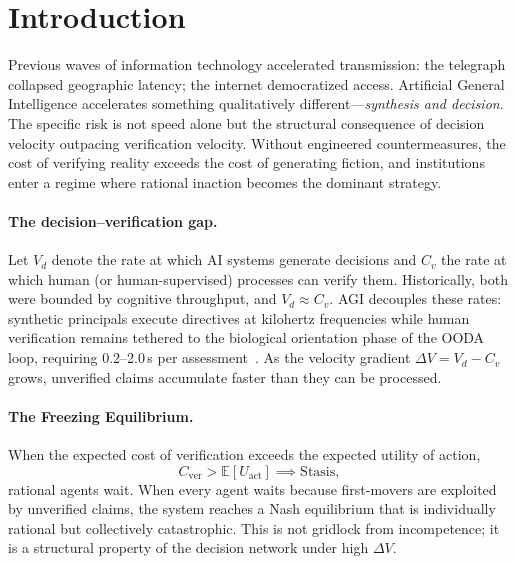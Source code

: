 \documentclass[runningheads]{llncs}
\begin{document}
\section{Introduction}
\label{sec:intro}

Previous waves of information technology accelerated transmission: the telegraph collapsed geographic latency; the internet democratized access. Artificial General Intelligence accelerates something qualitatively different---\emph{synthesis and decision}. The specific risk is not speed alone but the structural consequence of decision velocity outpacing verification velocity. Without engineered countermeasures, the cost of verifying reality exceeds the cost of generating fiction, and institutions enter a regime where rational inaction becomes the dominant strategy.

\paragraph{The decision--verification gap.}
Let $V_d$ denote the rate at which AI systems generate decisions and $C_v$ the rate at which human (or human-supervised) processes can verify them. Historically, both were bounded by cognitive throughput, and $V_d \approx C_v$. AGI decouples these rates: synthetic principals execute directives at kilohertz frequencies while human verification remains tethered to the biological orientation phase of the OODA loop, requiring 0.2--2.0\,s per assessment~\cite{raska2025ooda,greenwood2025ooda}. As the velocity gradient $\Delta V = V_d - C_v$ grows, unverified claims accumulate faster than they can be processed.

\paragraph{The Freezing Equilibrium.}
When the expected cost of verification exceeds the expected utility of action,
\begin{equation}
C_{\mathrm{ver}} > \mathbb{E}[U_{\mathrm{act}}] \implies \text{Stasis},
\label{eq:freeze}
\end{equation}
rational agents wait. When every agent waits because first-movers are exploited by unverified claims, the system reaches a Nash equilibrium that is individually rational but collectively catastrophic. This is not gridlock from incompetence; it is a structural property of the decision network under high $\Delta V$.
\end{document}
